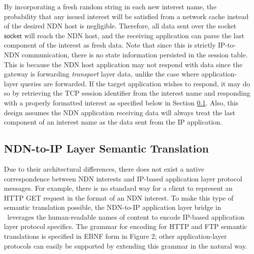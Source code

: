 %
By incorporating a fresh random string in each new interest name, the probability that any issued interest will be satisfied from a network cache instead of the desired NDN host is negligible. Therefore, all data sent over the socket $\mathsf{socket}$ will reach the NDN host, and the receiving application can parse the last component of the interest as fresh data. Note that since this is strictly IP-to-NDN communication, there is no state information persisted in the session table. This is because the NDN host application may not respond with data since the gateway is forwarding \emph{transport} layer data, unlike the case where application-layer queries are forwarded. If the target application wishes to respond, it may do so by retrieving the TCP session identifier from the interest name and responding with a properly formatted interest as specified below in Section \ref{sec:ndn-to-ip}. Also, this design assumes the NDN application receiving data will always treat the last component of an interest name as the data sent from the IP application. 


\subsection{NDN-to-IP Layer Semantic Translation}\label{sec:ndn-to-ip}
Due to their architectural differences, there does not exist a native correspondence between NDN interests and IP-based application layer protocol messages. For example, there is no standard way for a client to represent an HTTP GET request in the format of an NDN interest. To make this type of semantic translation possible, the NDN-to-IP application layer bridge in \sink\ leverages the human-readable names of content to encode IP-based application layer protocol specifics. The grammar for encoding for HTTP and FTP semantic translations is specified in EBNF form in Figure 2; other application-layer protocols can easily be supported by extending this grammar in the natural way.


